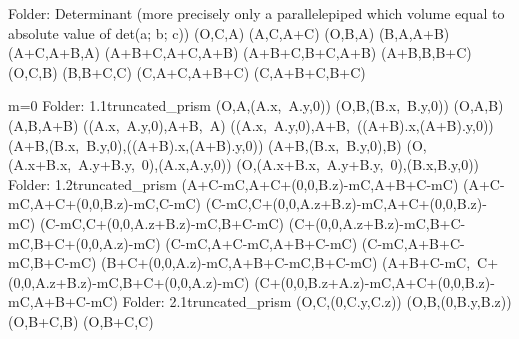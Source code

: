 Folder: Determinant (more precisely only a parallelepiped which volume equal to absolute value of det(a; b; c))
\left(O,C,A\right)
\left(A,C,A+C\right)
\left(O,B,A\right)
\left(B,A,A+B\right)
\left(A+C,A+B,A\right)
\left(A+B+C,A+C,A+B\right)
\left(A+B+C,B+C,A+B\right)
\left(A+B,B,B+C\right)
\left(O,C,B\right)
\left(B,B+C,C\right)
\left(C,A+C,A+B+C\right)
\left(C,A+B+C,B+C\right)

m=0
Folder: 1.1truncated_prism
\left(O,A,\left(A.x,\ A.y,0\right)\right)
\left(O,B,\left(B.x,\ B.y,0\right)\right)
\left(O,A,B\right)
\left(A,B,A+B\right)
\left(\left(A.x,\ A.y,0\right),A+B,\ A\right)
\left(\left(A.x,\ A.y,0\right),A+B,\ \left(\left(A+B\right).x,\left(A+B\right).y,0\right)\right)
\left(A+B,\left(B.x,\ B.y,0\right),\left(\left(A+B\right).x,\left(A+B\right).y,0\right)\right)
\left(A+B,\left(B.x,\ B.y,0\right),B\right)
\left(O,\left(A.x+B.x,\ A.y+B.y,\ 0\right),\left(A.x,A.y,0\right)\right)
\left(O,\left(A.x+B.x,\ A.y+B.y,\ 0\right),\left(B.x,B.y,0\right)\right)
Folder: 1.2truncated_prism
\left(A+C-mC,A+C+\left(0,0,B.z\right)-mC,A+B+C-mC\right)
\left(A+C-mC,A+C+\left(0,0,B.z\right)-mC,C-mC\right)
\left(C-mC,C+\left(0,0,A.z+B.z\right)-mC,A+C+\left(0,0,B.z\right)-mC\right)
\left(C-mC,C+\left(0,0,A.z+B.z\right)-mC,B+C-mC\right)
\left(C+\left(0,0,A.z+B.z\right)-mC,B+C-mC,B+C+\left(0,0,A.z\right)-mC\right)
\left(C-mC,A+C-mC,A+B+C-mC\right)
\left(C-mC,A+B+C-mC,B+C-mC\right)
\left(B+C+\left(0,0,A.z\right)-mC,A+B+C-mC,B+C-mC\right)
\left(A+B+C-mC,\ C+\left(0,0,A.z+B.z\right)-mC,B+C+\left(0,0,A.z\right)-mC\right)
\left(C+\left(0,0,B.z+A.z\right)-mC,A+C+\left(0,0,B.z\right)-mC,A+B+C-mC\right)
Folder: 2.1truncated_prism
\left(O,C,\left(0,C.y,C.z\right)\right)
\left(O,B,\left(0,B.y,B.z\right)\right)
\left(O,B+C,B\right)
\left(O,B+C,C\right)
